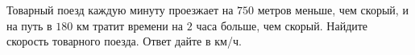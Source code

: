 \begin{ex}
	\begin{condition}
		Товарный поезд каждую минуту проезжает на \( 750 \) метров меньше, чем скорый, и на путь в \( 180 \) км тратит времени на \( 2 \) часа больше, чем скорый. Найдите скорость товарного поезда. Ответ дайте в км/ч.
	\end{condition}
\end{ex}